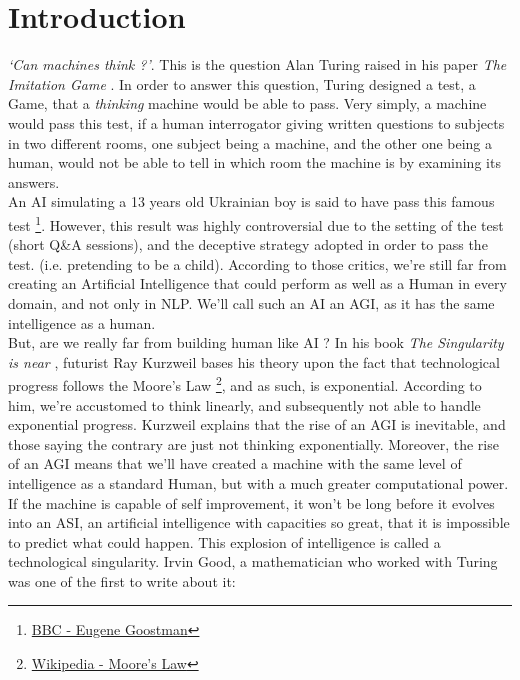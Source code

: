 \documentclass[12pt]{article}
\begin{document}
\section*{Introduction}\label{introduction}

\smallskip

{\em \lq Can machines think ?\rq }. This is the question Alan Turing raised in
his paper {\em The Imitation Game} \cite{Turing}. In order to answer this
question, Turing designed a test, a Game, that a {\em thinking} machine would be
able to pass. Very simply, a machine would pass this test, if a human
interrogator giving written questions to subjects in two different rooms, one
subject being a machine, and the other one being a human, would not be able to
tell in which room the machine is by examining its answers. \\

An AI simulating a 13 years old Ukrainian boy is said to have pass this famous
test \footnote{\href{http://www.bbc.com/news/technology-27762088} {BBC - Eugene
Goostman}}. However, this result was highly controversial due to the setting of
the test (short Q\&A sessions), and the deceptive strategy adopted in order to
pass the test. (i.e. pretending to be a child). According to those critics,
we're still far from creating an Artificial Intelligence that could perform as
well as a Human in every domain, and not only in \gls{NLP}. We'll call such an
AI an \gls{AGI}, as it has the same intelligence as a human. \\

But, are we really far from building human like AI ? In his book {\em The
Singularity is near} \cite{Kurzweil}, futurist Ray Kurzweil bases his theory
upon the fact that technological progress follows the Moore's Law
\footnote{\href{https://en.wikipedia.org/wiki/Moore\%27s_law} {Wikipedia -
Moore's Law} }, and as such, is exponential. According to him, we're accustomed
to think linearly, and subsequently not able to handle exponential progress.
Kurzweil explains that the rise of an \gls{AGI} is inevitable, and those saying
the contrary are just not thinking exponentially. Moreover, the rise of an
\gls{AGI} means that we'll have created a machine with the same level of
intelligence as a standard Human, but with a much greater computational power.
If the machine is capable of self improvement, it won't be long before it
evolves into an \gls{ASI}, an artificial intelligence with capacities so great,
that it is impossible to predict what could happen. This explosion of
intelligence is called a technological singularity. Irvin Good, a mathematician
who worked with Turing was one of the first to write about it: \\
\end{document}
